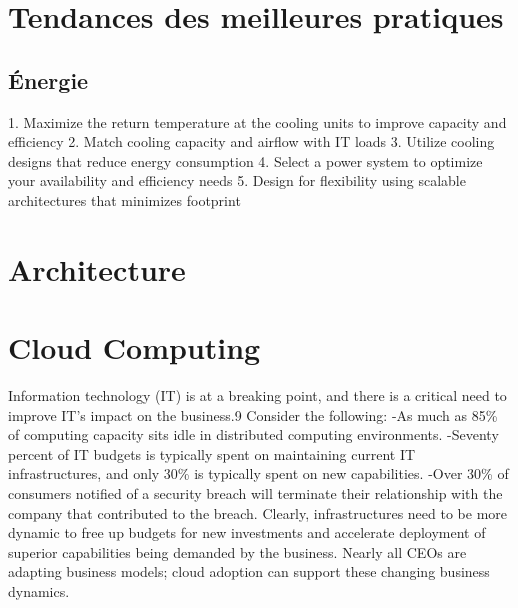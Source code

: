 \section{Tendances des meilleures pratiques}

\subsection{Énergie}
1. Maximize the return temperature at the cooling units to improve capacity and efficiency
2. Match cooling capacity and airflow with IT loads
3. Utilize cooling designs that reduce energy consumption
4. Select a power system to optimize your availability and efficiency needs
5. Design for flexibility using scalable architectures that minimizes footprint

\section{Architecture}

\section{Cloud Computing}

Information technology (IT) is at a breaking point, and there is a critical need to improve IT's impact on the business.9
Consider the following:
 -As much as 85\% of computing capacity sits idle in distributed computing environments.
 -Seventy percent of IT budgets is typically spent on maintaining current IT infrastructures, and only 30\% is typically spent on new capabilities.
 -Over 30\% of consumers notified of a security breach will terminate their relationship with the company that contributed to the breach.
Clearly, infrastructures need to be more dynamic to free up budgets for new investments and accelerate deployment of superior capabilities being demanded by the business. Nearly all CEOs are adapting business models; cloud adoption can support these changing business dynamics.

